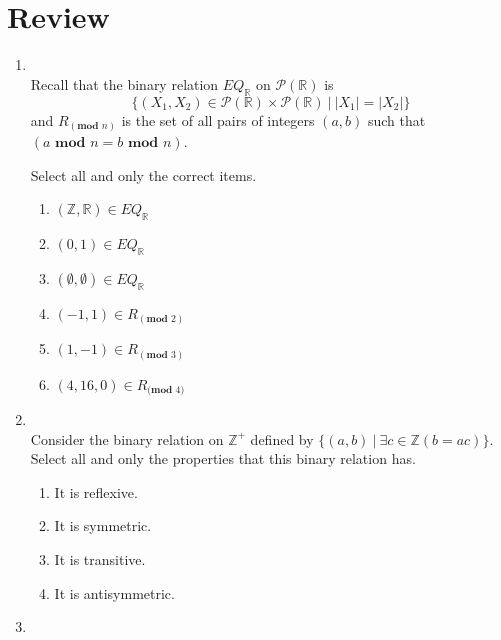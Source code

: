 \documentclass[12pt, oneside]{article}
\begin{document}
\section*{Review}
\begin{enumerate}
    \item \hspace{1in}\\ 

Recall that the binary relation $EQ_{\mathbb{R}}$ on $\mathcal{P}(\mathbb{R})$ is
\[
\{ (X_1, X_2 ) \in\mathcal{P}(\mathbb{R})  \times \mathcal{P}(\mathbb{R}) ~|~ |X_1| = |X_2| \}
\]
and $R_{(\textbf{mod } n)}$ is the set of all pairs of integers $(a, b)$ 
such that $(a \textbf{ mod } n = b \textbf{ mod } n)$.

Select all and only the correct items.
\begin{enumerate}
\item $(\mathbb{Z}, \mathbb{R}) \in EQ_{\mathbb{R}}$
\item $(0,1) \in EQ_{\mathbb{R}}$
\item $(\emptyset, \emptyset) \in EQ_{\mathbb{R}}$
\item $(-1,1) \in R_{(\textbf{mod } 2)}$
\item $(1,-1) \in R_{(\textbf{mod } 3)}$ 
\item $(4, 16, 0) \in R_{\textbf{(mod } 4)}$ 
\end{enumerate}     \item \hspace{1in}\\ 

Consider the binary relation on $\mathbb{Z}^+$ defined by $\{(a,b) ~|~ \exists c \in \mathbb{Z} ( b = ac)\}$.
Select all and only the properties that this binary relation has.
\begin{enumerate}
\item It is reflexive.
\item It is symmetric.
\item It is transitive.
\item It is antisymmetric.
\end{enumerate}     \item \hspace{1in}\\ 


\end{enumerate}
\end{document}
